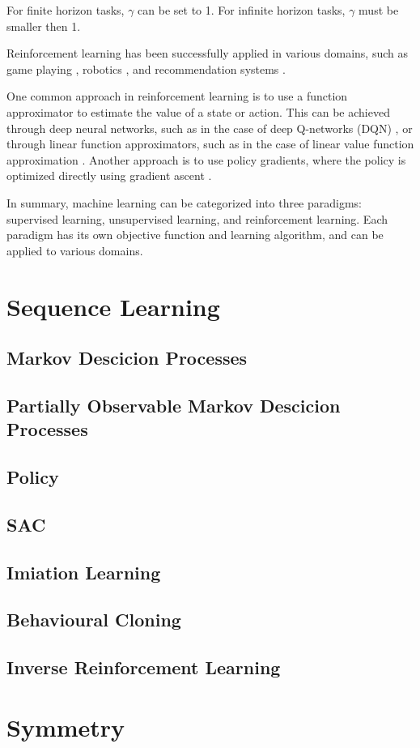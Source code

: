 For finite horizon tasks, $\gamma$ can be set to 1. For infinite horizon tasks, $\gamma$ must be smaller then 1.

Reinforcement learning has been successfully applied in various domains, such as game playing \cite{mnih2015human}, 
robotics \cite{kober2013reinforcement}, and recommendation systems \cite{zhao2018deep}.

One common approach in reinforcement learning is to use a function approximator to estimate the value of a state or action. 
This can be achieved through deep neural networks, such as in the case of deep Q-networks (DQN) \cite{mnih2015human}, or through 
linear function approximators, such as in the case of linear value function approximation \cite{sutton2018reinforcement}. Another approach 
is to use policy gradients, where the policy is optimized directly using gradient ascent \cite{sutton2000policy}.

In summary, machine learning can be categorized into three paradigms: supervised learning, unsupervised learning, 
and reinforcement learning. Each paradigm has its own objective function and learning algorithm, and can be applied to 
various domains.

\section{Sequence Learning}
\subsection{Markov Descicion Processes}
\subsection{Partially Observable Markov Descicion Processes}
\subsection{Policy}

\subsection{SAC}
\subsection{Imiation Learning}
\subsection{Behavioural Cloning}
\subsection{Inverse Reinforcement Learning}
\section{Symmetry}
